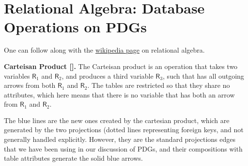 \documentclass{article}
\theoremstyle{definition}
\theoremstyle{remark}
\newcommand{\var}[1]{\mathsf{#1}}
\begin{document}
\section{Relational Algebra: Database Operations on PDGs}
One can follow along with the \href{https://en.wikipedia.org/wiki/Relational_algebra}{wikipedia page} on relational algebra.

\textbf{Carteisan Product [].}
The Carteisan product is an operation that takes two variables $\var R_1$ and $\var R_2$, and produces a third variable $\var R_3$, such that has all outgoing arrows from both $\var R_1$ and $\var R_2.$  The tables are restricted so that they share no attributes, which here means that there is no variable that has both an arrow from $\var R_1$ and $\var R_2$.

The blue lines are the new ones created by the cartesian product, which are generated by the two projections (dotted lines representing foreign keys, and not generally handled explicitly. However, they are the standard projections edges that we have been using in our discussion of PDGs, and their compositions with table attributes generate the solid blue arrows.
\end{document}
